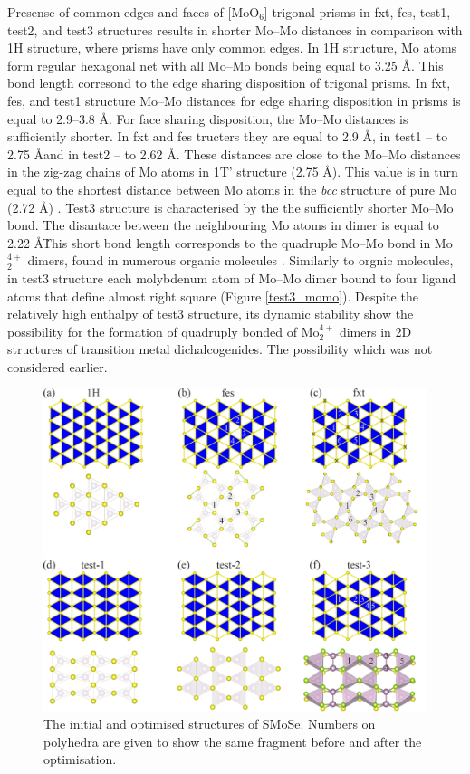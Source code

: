 \documentclass[a4paperm]{article}
\begin{document}
Presense of common edges and faces of [MoO$_6$] trigonal prisms in fxt, fes, test1, test2, and test3 structures results in shorter Mo--Mo distances in comparison with 1H structure, where prisms have only common edges.
In 1H structure, Mo atoms form regular hexagonal net with all Mo--Mo bonds being equal to 3.25 \AA.
This bond length corresond to the edge sharing disposition of trigonal prisms.
In fxt, fes, and test1 structure Mo--Mo distances for edge sharing disposition in prisms is equal to 2.9--3.8 \AA.
For face sharing disposition, the Mo--Mo distances is sufficiently shorter.
In fxt and fes tructers they are equal to 2.9 \AA, in test1 -- to 2.75 \AA and in test2 -- to 2.62 \AA.
These distances are close to the Mo--Mo distances in the zig-zag chains of Mo atoms in 1T' structure (2.75 \AA).
This value is in turn equal to the shortest distance between Mo atoms in the {\it bcc} structure of pure Mo (2.72 \AA) \cite{MoV}.
Test3 structure is characterised by the the sufficiently shorter Mo--Mo bond.
The disantace between the neighbouring Mo atoms in dimer is equal to 2.22 \AA\.
This short bond length corresponds to the quadruple Mo--Mo bond in Mo$_2^{4+}$ dimers, found in numerous organic molecules \cite{momo}.
Similarly to orgnic molecules, in test3 structure  each molybdenum atom of Mo--Mo dimer bound to four ligand atoms that define almost right square (Figure \ref{test3_momo}).
Despite the relatively high enthalpy of test3 structure, its dynamic stability show the possibility for the formation of quadruply bonded of Mo$_2^{4+}$ dimers in 2D structures of transition metal dichalcogenides.
The possibility which was not considered earlier.

\begin{figure}[H] \centering
        \includegraphics[width=\textwidth]{H-based.png}
        \caption{The initial and optimised structures of SMoSe. Numbers on polyhedra are given to show the same fragment before and after the optimisation.}
\label{H-based}
\end{figure}
\end{document}
